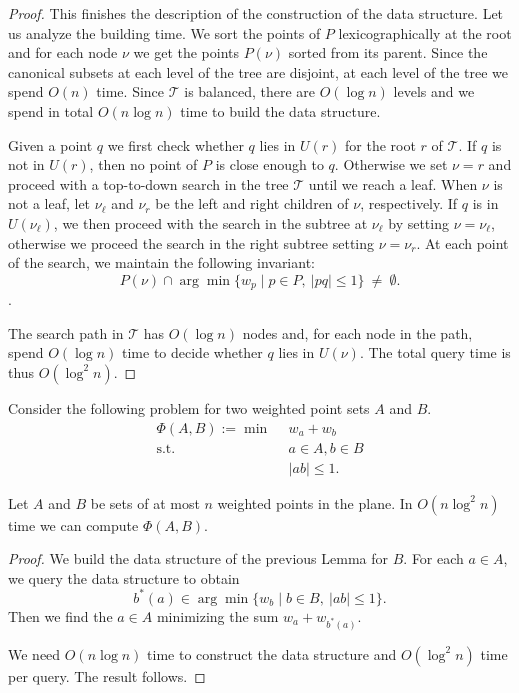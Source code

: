 \documentclass[a4paper,USenglish,numberwithinsect]{lipics}
\newcommand{\T}{\ensuremath{\mathcal{T}}}
\let\le\leqslant
\begin{document}
\begin{appendix}
\begin{proof}
	This finishes the description of the construction of the data structure.
	Let us analyze the building time. We sort the points of $P$ 
	lexicographically at the root and for each node $\nu$ 
	we get the points $P(\nu)$ sorted from its parent.
	Since the canonical subsets at each level of the tree are disjoint,
	at each level of the tree we spend $O(n)$ time. 
	Since $\T$ is balanced, there are $O(\log n)$ levels and
	we spend in total $O(n\log n)$ time to build the data structure.
	
	Given a point $q$ we first check whether $q$ lies in $U(r)$ for the root $r$ of $\T$.
	If $q$ is not in $U(r)$, then no point of $P$ is close enough to $q$.
	Otherwise we set $\nu=r$ and proceed with a top-to-down search in the tree $\T$ 
	until we reach a leaf. 
	When $\nu$ is not a leaf, 
	let $\nu_\ell$ and $\nu_r$ be the left and right children of $\nu$, respectively. 
	If $q$ is in $U(\nu_\ell)$, we then proceed with the search in the subtree
	at $\nu_\ell$ by setting $\nu=\nu_\ell$,
	otherwise we proceed the search in the right subtree setting $\nu=\nu_r$.
	At each point of the search, we maintain the following invariant:
	\[	P(\nu) \cap \arg\min \{ w_p \mid p\in P,~|pq|\le 1\} ~\not=~ \emptyset.
	\].
	
	The search path in $\T$ has $O(\log n)$ nodes and, for each node in the path,
	spend $O(\log n)$ time to decide whether $q$ lies in $U(\nu)$. The total
	query time is thus $O(\log^2 n)$.	 
\end{proof}

Consider the following problem for two weighted point sets $A$ and $B$.
\begin{align*}
	\Phi(A,B) :=\min ~~		& w_a+w_b\\
	 \mbox{s.t.}~~ & a \in A, b\in B\\
				&	|ab|\le 1. 
\end{align*}

\begin{lemma}
\label{le:within}
	Let $A$ and $B$ be sets of at most $n$ weighted points in the plane.
	In $O(n\log^2 n)$ time we can compute $\Phi(A,B)$.
\end{lemma}
\begin{proof}
	We build the data structure of the previous Lemma for $B$.
	For each $a\in A$, we query the data structure to obtain
	\[	
		b^*(a) \in \arg\min \{ w_b \mid b\in B,~|ab|\le 1\}.
	\]
	Then we find the $a\in A$ minimizing the sum $w_a+w_{b^*(a)}$.	

	We need $O(n\log n)$ time to construct the data structure and 
	$O(\log^2 n)$ time per query. The result follows.
\end{proof}



\end{appendix}
\end{document}

